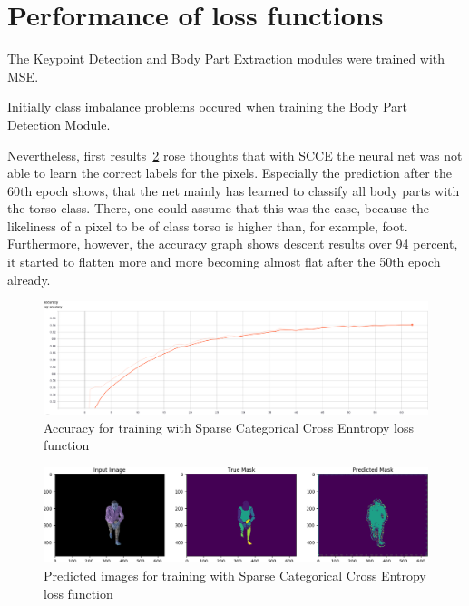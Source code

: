

\section{Performance of loss functions}

The Keypoint Detection and Body Part Extraction modules were trained with MSE.

Initially class imbalance problems occured when training the Body Part Detection Module.

Nevertheless, first results~\ref{fig:cross_entropy_pred_img} rose thoughts that with \gls{SCCE} the neural net was not able to
learn the correct labels for the pixels.
Especially the prediction after the 60th epoch shows, that the net mainly has learned to classify all body parts with the
torso class.
There, one could assume that this was the case, because the likeliness of a pixel to be of class torso is higher than, for
example, foot.
Furthermore, however, the accuracy graph shows descent results over 94 percent, it started to flatten more and more becoming
almost flat after the 50th epoch already.
\begin{figure}[H]
    \centering
    \includegraphics[width=\textwidth,height=\textheight,keepaspectratio]{Figures/accuracy_cross_entropy.png}
    \decoRule
    \caption[Loss Functions SCCE: Accuracy]{Accuracy for training with Sparse Categorical Cross Enntropy loss function}
    \label{fig:accuracy_cross_entropy}
\end{figure}
\begin{figure}[H]
    \centering
    \includegraphics[width=\textwidth,height=\textheight,keepaspectratio]{Figures/crossentropy_imgs_prediction_last_epoch.png}
    \decoRule
    \caption[Loss Functions SCCE: predictions]{Predicted images for training with Sparse Categorical Cross Entropy loss function}
    \label{fig:cross_entropy_pred_img}
\end{figure}
